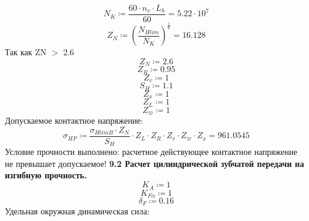 \documentclass{article}
\newcommand{\defeq}{\coloneq} %
\begin{document}
\begin{equation*}
N_{K} \defeq \frac{60 \cdot n_{v} \cdot L_{h}}{60} = {5.22 \cdot 10^{7}}
\end{equation*}
\begin{equation*}
Z_{N} \defeq \left( \frac{N_{Hlim}}{N_{K}} \right)^{\frac{1}{6}} = {16.128}
\end{equation*}
\colorbox[HTML]{000000}{Так как ZN $>$ 2.6}\newline
\begin{equation*}
Z_{N} \defeq 2.6
\end{equation*}
\begin{equation*}
Z_{R} \defeq 0.95
\end{equation*}
\begin{equation*}
Z_{v} \defeq 1
\end{equation*}
\begin{equation*}
S_{H} \defeq 1.1
\end{equation*}
\begin{equation*}
Z_{x} \defeq 1
\end{equation*}
\begin{equation*}
Z_{L} \defeq 1
\end{equation*}
\begin{equation*}
Z_{ϖ} \defeq 1
\end{equation*}
\colorbox[HTML]{000000}{Допускаемое контактное напряжение:}\newline
\begin{equation*}
σ_{HP} \defeq \frac{σ_{HlimB} \cdot Z_{N}}{S_{H}} \cdot Z_{L} \cdot Z_{R} \cdot Z_{v} \cdot Z_{ϖ} \cdot Z_{x} = {961.0545}
\end{equation*}
\colorbox[HTML]{FFFF80}{Условие прочности выполнено: расчетное действующее контактное напряжение не превышает допускаемое!}\newline
\colorbox[HTML]{000000}{\textbf{9.2 Расчет цилиндрической зубчатой передачи на изгибную прочность.}}\newline
\begin{equation*}
K_{A} \defeq 1
\end{equation*}
\begin{equation*}
K_{Fα} \defeq 1
\end{equation*}
\begin{equation*}
δ_{F} \defeq 0.16
\end{equation*}
\colorbox[HTML]{000000}{Удельная окружная динамическая сила:}\newline
\end{document}
